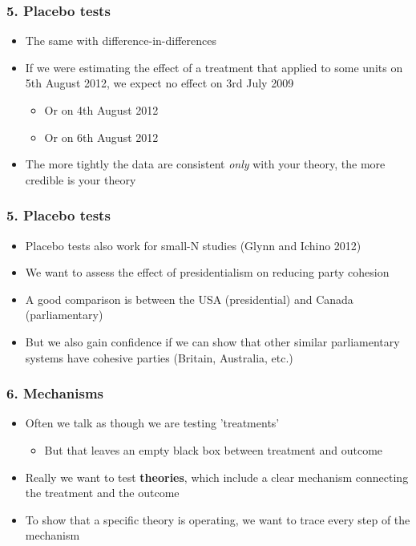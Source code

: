 \documentclass[xcolor=x11names,compress]{beamer}\usepackage[]{graphicx}\usepackage[]{xcolor}
\renewcommand{\(}{\begin{columns}}
\renewcommand{\)}{\end{columns}}
\newcommand{\<}[1]{\begin{column}{#1}}
\renewcommand{\>}{\end{column}}
\begin{document}
\begin{frame}
\frametitle{5. Placebo tests}
\begin{itemize}
\item The same with difference-in-differences
\pause
\item If we were estimating the effect of a treatment that applied to some units on 5th August 2012, we expect no effect on 3rd July 2009
\pause
\begin{itemize}
\item Or on 4th August 2012
\pause
\item Or on 6th August 2012
\pause
\end{itemize}
\item The more tightly the data are consistent \textit{only} with your theory, the more credible is your theory
\end{itemize}
\end{frame}

\begin{frame}
\frametitle{5. Placebo tests}
\begin{itemize}
\item Placebo tests also work for small-N studies (Glynn and Ichino 2012)
\pause
\item We want to assess the effect of presidentialism on reducing party cohesion
\pause
\item A good comparison is between the USA (presidential) and Canada (parliamentary)
\pause
\item But we also gain confidence if we can show that other similar parliamentary systems have cohesive parties (Britain, Australia, etc.)
\end{itemize}
\end{frame}

\begin{frame}
\frametitle{6. Mechanisms}
\begin{itemize}
\item Often we talk as though we are testing 'treatments'
\pause
\begin{itemize}
\item But that leaves an empty black box between treatment and outcome
\pause
\end{itemize}
\item Really we want to test \textbf{theories}, which include a clear mechanism connecting the treatment and the outcome
\pause
\item To show that a specific theory is operating, we want to trace every step of the mechanism
\end{itemize}
\end{frame}
\end{document}
